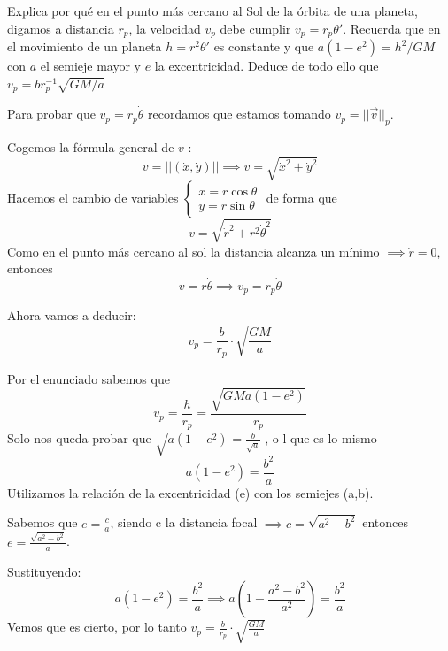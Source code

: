 \begin{problem}[5]
Explica por qué en el punto más cercano al Sol de la órbita de una planeta, digamos a distancia $r_p$, la velocidad $v_p$ debe cumplir $v_p=r_p\theta'$. Recuerda que en el movimiento de un planeta $h=r^2\theta'$ es constante y que $a(1-e^2)=h^2/GM$ con $a$ el semieje mayor y  $e$ la excentricidad. Deduce de todo ello que $v_p=br^{-1}_p\sqrt{GM/a}$

\solution
Para probar que $v_p=r_p\dot{\theta}$ recordamos que estamos tomando $v_p = ||\overrightarrow v||_p$.

Cogemos la fórmula general de $v$ : $$ v = ||(\dot{x}, \dot{y})|| \implies v= \sqrt{\dot{x}^2 + \dot{y}^2}$$
Hacemos el cambio de variables
$\begin{cases}
x = r\cos\theta\\
y = r\sin\theta
\end{cases}$ de forma que
$$v = \sqrt{\dot{r}^2 + r^2\dot{\theta}^2}$$
Como en el punto más cercano al sol la distancia alcanza un mínimo $\implies \dot r = 0$, entonces
$$v= r\dot{\theta} \implies v_p = r_p\dot{\theta}$$

Ahora vamos a deducir:
\[v_p = \frac{b}{r_p}\cdot \sqrt{\frac{GM}{a}}\]

Por el enunciado sabemos que
$$v_p = \frac{h}{r_p} = \frac{\sqrt{GMa(1-e^2)}}{r_p}$$
Solo nos queda probar que $\sqrt{a(1-e^2)}= \frac{b}{\sqrt{a}}$ , o l que es lo mismo
$$a(1-e^2) = \frac{b^2}{a}$$
Utilizamos la relación de la excentricidad (e) con los semiejes (a,b).

Sabemos que $e = \frac{c}{a}$, siendo c la distancia focal $\implies c= \sqrt{a^2-b^2}$ entonces $e = \frac{\sqrt{a^2 - b^2}}{a}$.

Sustituyendo:
$$a(1-e^2) = \frac{b^2}{a} \implies a(1-\frac{a^2 - b^2}{a^2}) = \frac{b^2}{a}$$
Vemos que es cierto, por lo tanto $v_p = \frac{b}{r_p}\cdot \sqrt{\frac{GM}{a}}$
\end{problem}

